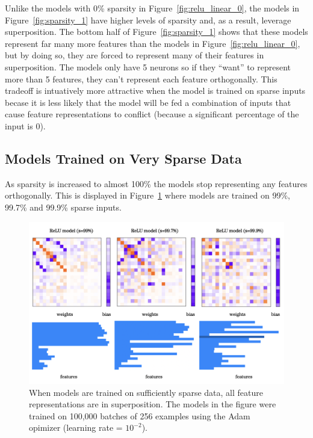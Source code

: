 \documentclass{article} %
\begin{document}
Unlike the models with 0\% sparsity in Figure~\ref{fig:relu_linear_0}, the models
in Figure~\ref{fig:sparsity_1} have higher levels of sparsity and, as
a result, leverage superposition. The bottom half of Figure~\ref{fig:sparsity_1}
shows that these models represent far many more features than the models in
Figure~\ref{fig:relu_linear_0}, but by doing so, they are forced to represent many 
of their features in superposition. The models only have 5 neurons so if they 
``want'' to represent more than 5 features, they can't represent each feature 
orthogonally. This tradeoff is intuatively more attractive when the model is
trained on sparse inputs becase it is less likely that the model will be fed
a combination of inputs that cause feature representations to conflict (because
a significant percentage of the input is 0).


\subsection{Models Trained on Very Sparse Data}

As sparsity is increased to almost 100\% the models stop representing any features
orthogonally. This is displayed in Figure~\ref{fig:sparsity_2} where models are
trained on 99\%, 99.7\% and 99.9\% sparse inputs.

\begin{figure}[h]
    \centering
    \includegraphics[width=0.75\linewidth]{demonstrating_superposition/images/sparsity_superposition2.png}
    \captionsetup{font=footnotesize, width=0.7\linewidth} %
    \caption{
        When models are trained on sufficiently sparse data, all feature
        representations are in superposition. The models in the figure were
        trained on 100,000 batches of 256 examples using the Adam opimizer 
        (learning rate = $10^{-2}$).
    }
    \label{fig:sparsity_2}
\end{figure}
\end{document}
